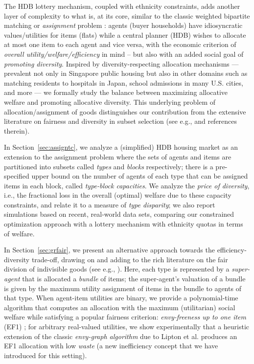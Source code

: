 \documentclass[11pt,dvipdfmx]{article}
\begin{document}
The HDB lottery mechanism, coupled with ethnicity constraints, adds another layer of complexity to what is, at its core, similar to the classic weighted bipartite matching or \emph{assignment} problem \cite{kuhn1955hungarian,munkres1957algo}: agents (buyer households) have idiosyncratic values/utilities for items (flats) while a central planner (HDB) wishes to allocate at most one item to each agent and vice versa, with the economic criterion of \emph{overall utility/welfare/efficiency} in mind -- but also with an added social goal of \emph{promoting diversity}. 
Inspired by diversity-respecting allocation mechanisms --- prevalent not only in Singapore public housing but also in other domains such as matching residents to hospitals in Japan, school admissions in many U.S. cities, and more \cite{kamada2015efficient,USedu2017,fragiadakis2017improving} --- we formally study the balance between maximizing allocative welfare and promoting allocative diversity. This underlying problem of allocation/assignment of goods distinguishes our contribution from the extensive literature on fairness and diversity in subset selection (see e.g., \cite{stoyanovich2018online,bredereck2018multiwinner} and references therein). 

In Section~\ref{sec:assigntc}, we analyze a (simplified) HDB housing market as an extension to the assignment problem where the sets of agents and items are partitioned into subsets called \emph{types} and \emph{blocks} respectively; there is a pre-specified upper bound on the number of agents of each type that can be assigned items in each block, called \emph{type-block capacities}. 
We analyze the {\em price of diversity}, i.e., the fractional loss in the overall (optimal) welfare due to these capacity constraints, and relate it to a measure of \emph{type disparity}; we also report simulations based on recent, real-world data sets, comparing our constrained optimization approach with a lottery mechanism with ethnicity quotas in terms of welfare.     

In Section~\ref{sec:grfair}, we present an alternative approach towards the efficiency-diversity trade-off, drawing on and adding to the rich literature on the fair division of indivisible goods (see e.g., \cite{procaccia2014fair,caragiannis2016unreasonable,kurokawa2016can,barman2017finding,barman2017approx}). Here, each type is represented by a \emph{super-agent} that is allocated a \emph{bundle} of items; the super-agent's valuation of a bundle is given by the maximum utility assignment of items in the bundle to agents of that type. When agent-item utilities are binary, we provide a polynomial-time algorithm that computes an allocation with the maximum (utilitarian) social welfare while satisfying a popular fairness criterion: \emph{envy-freeness up to one item} (EF1) \cite{budish2011combinatorial}; for arbitrary real-valued utilities, we show experimentally that a heuristic extension of the classic \emph{envy-graph algorithm} due to Lipton et al. \cite{lipton2004approximately} produces an EF1 allocation with low \emph{waste} (a new inefficiency concept that we have introduced for this setting).
\end{document}

